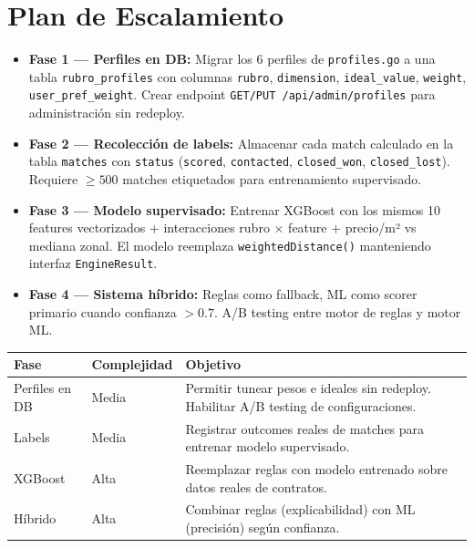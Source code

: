 \documentclass[11pt,a4paper]{article}
\begin{document}
\section{Plan de Escalamiento}
\begin{itemize}
    \item \textbf{Fase 1 — Perfiles en DB:} Migrar los 6 perfiles de \texttt{profiles.go} a una tabla \texttt{rubro\_profiles} con columnas \texttt{rubro}, \texttt{dimension}, \texttt{ideal\_value}, \texttt{weight}, \texttt{user\_pref\_weight}. Crear endpoint \texttt{GET/PUT /api/admin/profiles} para administración sin redeploy.
    \item \textbf{Fase 2 — Recolección de labels:} Almacenar cada match calculado en la tabla \texttt{matches} con \texttt{status} (\texttt{scored}, \texttt{contacted}, \texttt{closed\_won}, \texttt{closed\_lost}). Requiere $\geq 500$ matches etiquetados para entrenamiento supervisado.
    \item \textbf{Fase 3 — Modelo supervisado:} Entrenar XGBoost con los mismos 10 features vectorizados + interacciones rubro $\times$ feature + precio/m² vs mediana zonal. El modelo reemplaza \texttt{weightedDistance()} manteniendo interfaz \texttt{EngineResult}.
    \item \textbf{Fase 4 — Sistema híbrido:} Reglas como fallback, ML como scorer primario cuando confianza $> 0.7$. A/B testing entre motor de reglas y motor ML.
\end{itemize}

\begin{table}[H]
    \centering
    \renewcommand{\arraystretch}{1.2}
    \begin{tabularx}{\textwidth}{>{\hsize=0.15\hsize}X >{\hsize=0.25\hsize}X >{\hsize=0.6\hsize}X}
        \toprule
        \textbf{Fase} & \textbf{Complejidad} & \textbf{Objetivo} \\
        \midrule
        Perfiles en DB & Media & Permitir tunear pesos e ideales sin redeploy. Habilitar A/B testing de configuraciones. \\
        Labels & Media & Registrar outcomes reales de matches para entrenar modelo supervisado. \\
        XGBoost & Alta & Reemplazar reglas con modelo entrenado sobre datos reales de contratos. \\
        Híbrido & Alta & Combinar reglas (explicabilidad) con ML (precisión) según confianza. \\
        \bottomrule
    \end{tabularx}
\end{table}
\end{document}
